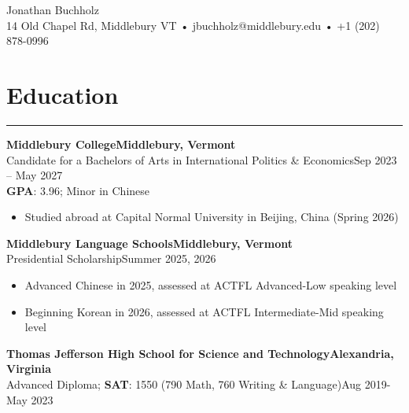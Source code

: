 \documentclass[12pt, a4paper]{article}
\begin{document}
\begin{center}
\vspace{-7mm}
{\LARGE Jonathan Buchholz}\\
14 Old Chapel Rd, Middlebury VT • jbuchholz@middlebury.edu • +1 (202) 878-0996\\
\end{center}

\vspace{-8mm}
\section*{\centering Education}
\vspace{-7mm}
\rule{\linewidth}{0.4pt}
\textbf{Middlebury College}\hfill\textbf{Middlebury, Vermont}\\
Candidate for a Bachelors of Arts in International Politics \& Economics\hfill{Sep 2023 -- May 2027}\\
\textbf{GPA}: 3.96; Minor in Chinese\\
\begin{itemize}
    \vspace{-8mm}
    \item Studied abroad at Capital Normal University in Beijing, China (Spring 2026)
\end{itemize}
\textbf{Middlebury Language Schools}\hfill\textbf{Middlebury, Vermont}\\
Presidential Scholarship\hfill{Summer 2025, 2026}\\
\begin{itemize}
    \vspace{-8mm}
    \item Advanced Chinese in 2025, assessed at ACTFL Advanced-Low speaking level
    \item Beginning Korean in 2026, assessed at ACTFL Intermediate-Mid speaking level
\end{itemize}
\textbf{Thomas Jefferson High School for Science and Technology}\hfill\textbf{Alexandria, Virginia}\\
Advanced Diploma; \textbf{SAT}: 1550 (790 Math, 760 Writing \& Language)\hfill{Aug 2019-May 2023}\\
\end{document}
